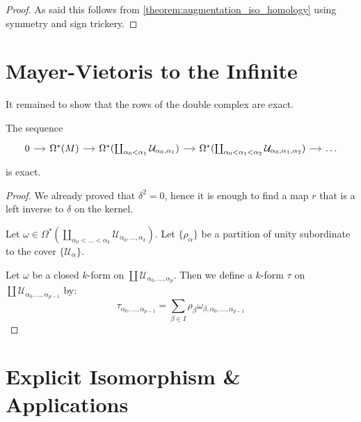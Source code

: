 \begin{proof}
As said this follows from \ref{theorem:augmentation_iso_homology}
using symmetry and sign trickery.
\end{proof}


\section{Mayer-Vietoris to the Infinite}
It remained to show that the rows of the double complex are exact.
\begin{theorem}
The sequence
\[\begin{tikzcd}[column sep=small]
	0 & {\Omega^*(M)} & {\Omega^*(\coprod_{\alpha_0 < \alpha_1} \mathcal{U}_{\alpha_0, \alpha_1})} & {\Omega^*(\coprod_{\alpha_0 < \alpha_1 < \alpha_2} \mathcal{U}_{\alpha_0, \alpha_1, \alpha_2})} & \dots
	\arrow[from=1-1, to=1-2]
	\arrow[from=1-2, to=1-3]
	\arrow[from=1-3, to=1-4]
	\arrow[from=1-4, to=1-5]
\end{tikzcd}\]
is exact.
\end{theorem}
\begin{proof}
We already proved that $\delta^2 = 0$, hence it is enough to find a map $r$ that is a
left inverse to $\delta$ on the kernel.

Let $\omega \in \Omega^*(\coprod_{\alpha_0 < \dots < \alpha_k} \mathcal{U}_{\alpha_0, \dots, \alpha_k})$.
Let $\{\rho_\alpha\}$ be a partition of unity subordinate to the cover $\{\mathcal{U}_\alpha\}$.

Let $\omega$ be a closed $k$-form on $\coprod \mathcal{U}_{\alpha_0, \dots, \alpha_p}$. Then we define
a $k$-form $\tau$ on $\coprod \mathcal{U}_{\alpha_0, \dots, \alpha_{p - 1}}$ by:
\[
	\tau_{\alpha_0, \dots, \alpha_{p - 1}} = \sum_{\beta \in I} \rho_\beta \omega_{\beta, \alpha_0, \dots, \alpha_{p - 1}}
\]


\end{proof}

\section{Explicit Isomorphism \& Applications}

